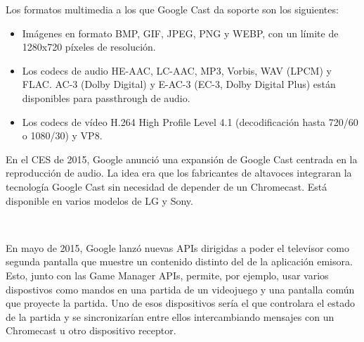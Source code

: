 Los formatos multimedia a los que Google Cast da soporte son los siguientes:

\begin{itemize}

	\item Imágenes en formato BMP, GIF, JPEG, PNG y WEBP, con un límite de 1280x720 píxeles de resolución.

	\item Los codecs de audio HE-AAC, LC-AAC, MP3, Vorbis, WAV (LPCM) y FLAC. AC-3 (Dolby Digital) y E-AC-3 (EC-3, Dolby Digital Plus) están disponibles para passthrough de audio.

	\item Los codecs de vídeo H.264 High Profile Level 4.1 (decodificación hasta 720/60 o 1080/30) y VP8.

\end{itemize}

En el CES de 2015, Google anunció una expansión de Google Cast centrada en la reproducción de audio.
La idea era que los fabricantes de altavoces integraran la tecnología Google Cast sin necesidad de depender de un Chromecast.
Está disponible en varios modelos de LG y Sony.

\

En mayo de 2015, Google lanzó nuevas APIs dirigidas a poder el televisor como segunda pantalla que muestre un contenido distinto del de la aplicación emisora.
Esto, junto con las Game Manager APIs, permite, por ejemplo, usar varios dispostivos como mandos en una partida de un videojuego y una pantalla común que proyecte la partida.
Uno de esos dispositivos sería el que controlara el estado de la partida y se sincronizarían entre ellos intercambiando mensajes con un Chromecast u otro dispositivo receptor.

